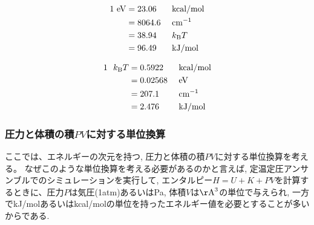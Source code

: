 \begin{alignat}{3}
  1~\mathrm{eV}
  &= 23.06   &&~\mathrm{kcal/mol}      \notag \\
  &= 8064.6  &&~\mathrm{cm^{-1}} \notag \\
  &= 38.94   &&~k_{\mathrm{B}}T  \notag \\
  &= 96.49   &&~\mathrm{kJ/mol} \notag
\end{alignat}

\begin{alignat}{3}
  1~~k_{\mathrm{B}}T
  &= 0.5922  &&~\mathrm{kcal/mol} \notag \\
  &= 0.02568 &&~\mathrm{eV}      \notag \\
  &= 207.1   &&~\mathrm{cm^{-1}} \notag \\
  &= 2.476   &&~\mathrm{kJ/mol} \notag
\end{alignat}

\subsubsection{圧力と体積の積$PV$に対する単位換算}

ここでは、エネルギーの次元を持つ, 圧力と体積の積$PV$に対する単位換算を考える。
なぜこのような単位換算を考える必要があるのかと言えば, 定温定圧アンサンブルでのシミュレーションを実行して, エンタルピー$H = U + K + PV$を計算するときに、圧力$P$は気圧(1atm)あるいはPa, 体積$V$は$\mathrm{\AA}^3$の単位で与えられ, 一方でkJ/molあるいはkcal/molの単位を持ったエネルギー値を必要とすることが多いからである.

